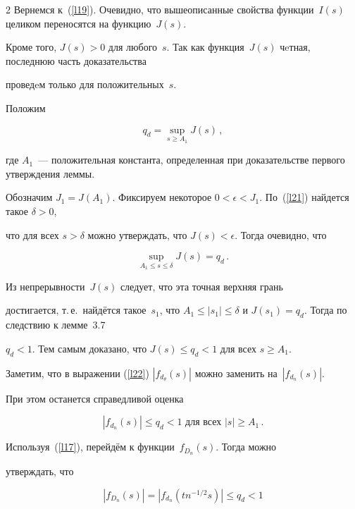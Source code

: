 \begin{multicols}{2}
Вернемся к~(\ref{l19}). Очевидно, что вышеописанные свойства функции~$I(s)$ целиком переносятся на функцию~$J(s)$. 


Кроме того, $J(s) > 0$ для любого~$s$. Так как функция~$J(s)$ чeтная, последнюю часть доказательства 


проведeм только для положительных~$s$.





Положим


$$


q_d = \sup\limits_{s \geq A_1} J(s)\,,


$$


где $A_1$~--- положительная константа, определенная при доказательстве первого утверждения леммы. 


Обозначим $J_1 = J(A_1)$. Фиксируем некоторое $0< \epsilon < J_1$. По~(\ref{l21}) найдется такое $\delta>0$, 


что для всех $s>\delta$ можно утверждать, что $J(s)<\epsilon$. Тогда очевидно, что


$$


\sup\limits_{A_1 \leq s \leq \delta} J(s) = q_d\,.


$$


Из непрерывности~$J(s)$ следует, что эта точная верхняя грань


достигается, т.\,е.\ найдётся такое~$s_1$, что $A_1 \leq |s_1| \leq


\delta$ и $J(s_1) = q_d$. Тогда по следствию к лемме~3.7


$q_d < 1$. Тем самым доказано, что $J(s) \leq q_d < 1$ для всех $s


\geq A_1$.





Заметим, что в выражении (\ref{l22}) $|f_{d_{\theta}}(s)|$ можно заменить на~$|f_{d_n}(s)|$. 


При этом останется справедливой оценка


$$


|f_{d_n}(s)| \leq q_d < 1 \mbox{ для всех } |s| \geq A_1\,.


$$


Используя~(\ref{l17}), перейдём к функции~$f_{D_n}(s)$. Тогда можно


утверждать, что


$$


|f_{D_n}(s)| = |f_{d_n}(tn^{-1/2}s)| \leq q_d < 1


$$



\end{multicols}

